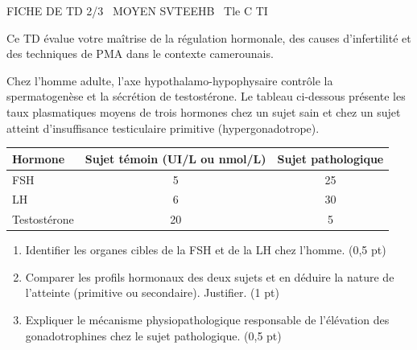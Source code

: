\documentclass[11pt]{article}
\begin{document}
\begin{tcolorbox}[enhanced,colback=popink,colframe=popink,arc=10pt,boxrule=0pt,left=12pt,right=12pt,top=9pt,bottom=9pt]
{\color{white}\popxbold\small FICHE DE TD 2/3 \textbullet\ MOYEN \hfill SVTEEHB \textbullet\ Tle C TI\par}
\end{tcolorbox}
\vspace{4pt}
Ce TD évalue votre maîtrise de la régulation hormonale, des causes d'infertilité et des techniques de PMA dans le contexte camerounais.

\begin{exercice}
\label{exo:regul_homme}
Chez l'homme adulte, l'axe hypothalamo-hypophysaire contrôle la spermatogenèse et la sécrétion de testostérone. Le tableau ci-dessous présente les taux plasmatiques moyens de trois hormones chez un sujet sain et chez un sujet atteint d'insuffisance testiculaire primitive (hypergonadotrope).

\begin{center}
\begin{tabular}{|l|c|c|}
\hline
\textbf{Hormone} & \textbf{Sujet témoin (UI/L ou nmol/L)} & \textbf{Sujet pathologique} \\
\hline
FSH & 5 & 25 \\
LH & 6 & 30 \\
Testostérone & 20 & 5 \\
\hline
\end{tabular}
\end{center}

\begin{enumerate}
\item Identifier les organes cibles de la FSH et de la LH chez l'homme. \hfill (0,5 pt)
\item Comparer les profils hormonaux des deux sujets et en déduire la nature de l'atteinte (primitive ou secondaire). Justifier. \hfill (1 pt)
\item Expliquer le mécanisme physiopathologique responsable de l'élévation des gonadotrophines chez le sujet pathologique. \hfill (0,5 pt)
\end{enumerate}
\end{exercice}
\end{document}
